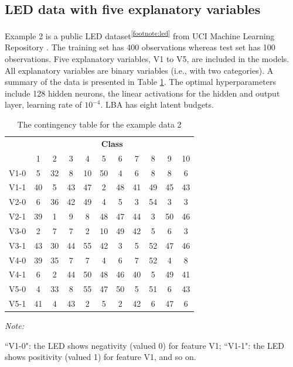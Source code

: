 \documentclass[]{interact}
\theoremstyle{plain}%
\theoremstyle{definition}
\theoremstyle{remark}
\begin{document}
\hypertarget{subsection:example2}{%
\subsection{LED data with five explanatory
variables}\label{subsection:example2}}

Example 2 is a public LED dataset\textsuperscript{\ref{footnote:led}}
from UCI Machine Learning Repository \citep{Dua2019}. The training set
has 400 observations whereas test set has 100 observations. Five
explanatory variables, V1 to V5, are included in the models. All
explanatory variables are binary variables (i.e., with two categories).
A summary of the data is presented in Table \ref{tab:tabex2}. The
optimal hyperparameters include 128 hidden neurons, the linear
activations for the hidden and output layer, learning rate of
\(10^{-4}\). LBA has eight latent budgets.

\begin{table}[H]

\caption{\label{tab:tabex2}The contingency table for the example data 2}
\centering
\begin{threeparttable}
\begin{tabular}[t]{lcccccccccc}
\toprule
\multicolumn{1}{c}{\textbf{ }} & \multicolumn{10}{c}{\textbf{Class}} \\
\cmidrule(l{3pt}r{3pt}){2-11}
  & 1 & 2 & 3 & 4 & 5 & 6 & 7 & 8 & 9 & 10\\
\midrule
V1-0 & 5 & 32 & 8 & 10 & 50 & 4 & 6 & 8 & 8 & 6\\
V1-1 & 40 & 5 & 43 & 47 & 2 & 48 & 41 & 49 & 45 & 43\\
V2-0 & 6 & 36 & 42 & 49 & 4 & 5 & 3 & 54 & 3 & 3\\
V2-1 & 39 & 1 & 9 & 8 & 48 & 47 & 44 & 3 & 50 & 46\\
V3-0 & 2 & 7 & 7 & 2 & 10 & 49 & 42 & 5 & 6 & 3\\
\addlinespace
V3-1 & 43 & 30 & 44 & 55 & 42 & 3 & 5 & 52 & 47 & 46\\
V4-0 & 39 & 35 & 7 & 7 & 4 & 6 & 7 & 52 & 4 & 8\\
V4-1 & 6 & 2 & 44 & 50 & 48 & 46 & 40 & 5 & 49 & 41\\
V5-0 & 4 & 33 & 8 & 55 & 47 & 50 & 5 & 51 & 6 & 43\\
V5-1 & 41 & 4 & 43 & 2 & 5 & 2 & 42 & 6 & 47 & 6\\
\bottomrule
\end{tabular}
\begin{tablenotes}
\small
\item \textit{Note: } 
\item ``V1-0": the LED shows negativity (valued 0) for feature V1; ``V1-1": the LED shows positivity (valued 1) for feature V1, and so on.
\end{tablenotes}
\end{threeparttable}
\end{table}
\end{document}
